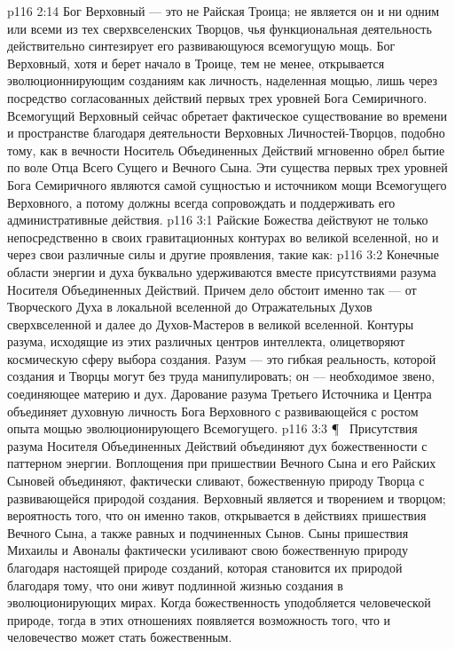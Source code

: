 \vs p116 2:14 Бог Верховный --- это не Райская Троица; не является он и ни одним или всеми из тех сверхвселенских Творцов, чья функциональная деятельность действительно синтезирует его развивающуюся всемогущую мощь. Бог Верховный, хотя и берет начало в Троице, тем не менее, открывается эволюционнирующим созданиям как личность, наделенная мощью, лишь через посредство согласованных действий первых трех уровней Бога Семиричного. Всемогущий Верховный сейчас обретает фактическое существование во времени и пространстве благодаря деятельности Верховных Личностей\hyp{}Творцов, подобно тому, как в вечности Носитель Объединенных Действий мгновенно обрел бытие по воле Отца Всего Сущего и Вечного Сына. Эти существа первых трех уровней Бога Семиричного являются самой сущностью и источником мощи Всемогущего Верховного, а потому должны всегда сопровождать и поддерживать его административные действия.
\vs p116 3:1 Райские Божества действуют не только непосредственно в своих гравитационных контурах во великой вселенной, но и через свои различные силы и другие проявления, такие как:
\vs p116 3:2 \bibnobreakspace {} Конечные области энергии и духа буквально удерживаются вместе присутствиями разума Носителя Объединенных Действий. Причем дело обстоит именно так --- от Творческого Духа в локальной вселенной до Отражательных Духов сверхвселенной и далее до Духов\hyp{}Мастеров в великой вселенной. Контуры разума, исходящие из этих различных центров интеллекта, олицетворяют космическую сферу выбора создания. Разум --- это гибкая реальность, которой создания и Творцы могут без труда манипулировать; он --- необходимое звено, соединяющее материю и дух. Дарование разума Третьего Источника и Центра объединяет духовную личность Бога Верховного с развивающейся с ростом опыта мощью эволюционирующего Всемогущего.
\vs p116 3:3 \P\ \bibnobreakspace {} Присутствия разума Носителя Объединенных Действий объединяют дух божественности с паттерном энергии. Воплощения при пришествии Вечного Сына и его Райских Сыновей объединяют, фактически сливают, божественную природу Творца с развивающейся природой создания. Верховный является и творением и творцом; вероятность того, что он именно таков, открывается в действиях пришествия Вечного Сына, а также равных и подчиненных Сынов. Сыны пришествия Михаилы и Авоналы фактически усиливают свою божественную природу благодаря настоящей природе созданий, которая становится их природой благодаря тому, что они живут подлинной жизнью создания в эволюционирующих мирах. Когда божественность уподобляется человеческой природе, тогда в этих отношениях появляется возможность того, что и человечество может стать божественным.
